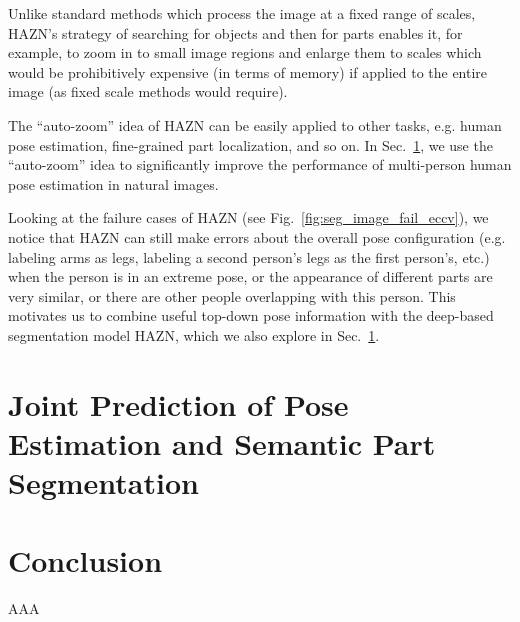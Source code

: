 Unlike standard methods which process the image at a fixed range of scales, HAZN’s strategy of searching for objects and then for parts enables it, for example, to zoom in to small image regions and enlarge them to scales which would be prohibitively expensive (in terms of memory) if applied to the entire image (as fixed scale methods would require).

The ``auto-zoom'' idea of HAZN can be easily applied to other tasks, e.g. human pose estimation, fine-grained part localization, and so on.
In Sec.~\ref{sec:pose_and_seg}, we use the ``auto-zoom'' idea to significantly improve the performance of multi-person human pose estimation in
natural images.

Looking at the failure cases of HAZN (see Fig.~\ref{fig:seg_image_fail_eccv}), we notice that HAZN can still make errors about the overall pose configuration (e.g. labeling arms as legs, labeling a second person’s legs as the first person’s, etc.) when the person is in an extreme pose,
or the appearance of different parts are very similar, or there are other people overlapping with this person.
This motivates us to combine useful top-down pose information with the deep-based segmentation model HAZN, which we also explore in Sec.~\ref{sec:pose_and_seg}.

\section{Joint Prediction of Pose Estimation and Semantic Part Segmentation}
\label{sec:pose_and_seg}

\section{Conclusion}

\begin{acknowledgements}
AAA
\end{acknowledgements}


